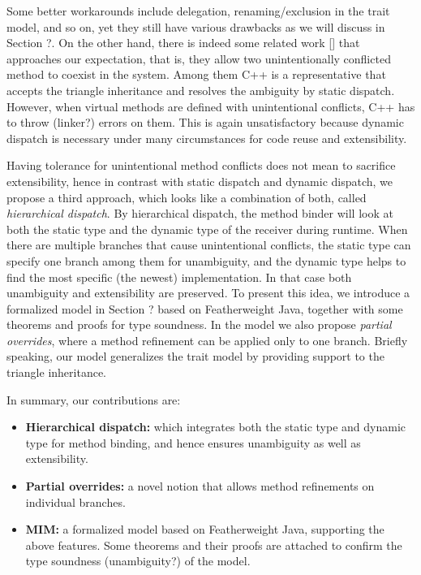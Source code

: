 Some better workarounds include delegation, renaming/exclusion in the trait model, and so on, yet they still have various drawbacks as we will discuss in Section ?. On the other hand, there is indeed some related work [] that approaches our expectation, that is, they allow two unintentionally conflicted method to coexist in the system. Among them C++ is a representative that accepts the triangle inheritance and resolves the ambiguity by static dispatch. However, when virtual methods are defined with unintentional conflicts, C++ has to throw (linker?) errors on them.
This is again unsatisfactory because dynamic dispatch is necessary under many circumstances for code reuse and extensibility.

Having tolerance for unintentional method conflicts does not mean to sacrifice extensibility, hence in contrast with static dispatch and dynamic dispatch, we propose a third approach, which looks like a combination of both, called \textit{hierarchical dispatch}. By hierarchical dispatch, the method binder will look at both the static type and the dynamic type of the receiver during runtime. When there are multiple branches that cause unintentional conflicts, the static type can specify one branch among them for unambiguity, and the dynamic type helps to find the most specific (the newest) implementation. In that case both unambiguity and extensibility are preserved. To present this idea, we introduce a formalized model in Section ? based on Featherweight Java, together with some theorems and proofs for type soundness. In the model we also propose \textit{partial overrides}, where a method refinement can be applied only to one branch. Briefly speaking, our model generalizes the trait model by providing support to the triangle inheritance.

In summary, our contributions are: 
\begin{itemize}
	\item \textbf{Hierarchical dispatch:} which integrates both the static type and dynamic type for method binding, and hence
	ensures unambiguity as well as extensibility.
	\item \textbf{Partial overrides:} a novel notion that allows method refinements on individual branches.
	\item \textbf{MIM:} a formalized model based on Featherweight Java, supporting the above features. Some theorems and their proofs
	are attached to confirm the type soundness (unambiguity?) of the model.
\end{itemize}

 